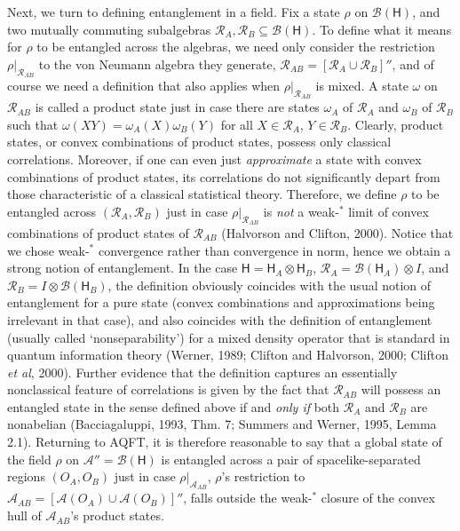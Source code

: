 \documentclass[12pt]{article}
\newcommand{\alg}[1]{\mbox{$\mathcal{#1}$}}
\newcommand{\hil}[1]{\mbox{$\mathsf{#1}$}}
\begin{document}
Next, we turn to defining entanglement in a field.  Fix a state $\rho$  on 
$\alg{B}(\hil{H})$, and
two mutually commuting subalgebras $\alg{R}_{A},\alg{R}_{B}\subseteq\alg{B}(\hil{H})$.
  To define what it means for $\rho$ to be 
entangled across the algebras, we need only consider the 
restriction $\rho|_{\alg{R}_{AB}}$ to the von Neumann algebra they generate, 
$\alg{R}_{AB}=[\alg{R}_{A}\cup\alg{R}_{B}]''$, and of course we need a 
definition that also applies when 
$\rho|_{\alg{R}_{AB}}$ is mixed.
A state $\omega$ on $\alg{R}_{AB}$ is called a product 
 state just in case there are states $\omega _{A}$ of
$\alg{R}_{A}$ and $\omega _{B}$ of $\alg{R}_{B}$ such that
$\omega (XY)=\omega _{A}(X)\omega _{B}(Y)$ for all 
$X\in\alg{R}_{A}$, $Y\in\alg{R}_{B}$.
Clearly, product states, or convex combinations of product states, 
possess only classical correlations.  Moreover, if one can even just 
\emph{approximate} a state with convex combinations of product 
states, its correlations do not significantly depart from 
those characteristic of a classical statistical theory.  Therefore, we define $\rho$ 
to be entangled across $(\alg{R}_{A},\alg{R}_{B})$ just in case 
$\rho|_{\alg{R}_{AB}}$ 
is \emph{not} a weak-$^{*}$ limit of convex combinations of product states of 
$\alg{R}_{AB}$ (Halvorson and Clifton, 2000).      
Notice that we chose weak-$^{*}$ convergence rather than convergence in 
norm, hence we obtain a strong notion of 
entanglement.  In the case $\hil{H}=\hil{H}_{A}\otimes 
\hil{H}_{B}$, $\alg{R}_{A}=\alg{B}(\hil{H}_{A})\otimes I$, and 
$\alg{R}_{B}=I\otimes\alg{B}(\hil{H}_{B})$, the definition obviously 
coincides with the usual notion of entanglement for a pure state 
(convex combinations and approximations being irrelevant in 
that case), and also coincides with
the definition of entanglement (usually called `nonseparability') for a mixed density operator  
that is standard in quantum information theory 
 (Werner, 
1989; Clifton 
and Halvorson, 2000; Clifton \emph{et al}, 2000).  Further evidence 
that the definition captures 
an essentially nonclassical feature of correlations is given by the fact  that  
$\alg{R}_{AB}$ will possess an entangled state in the sense defined 
above
 if and \emph{only if} both $\alg{R}_{A}$ and $\alg{R}_{B}$ are nonabelian 
 (Bacciagaluppi, 1993, Thm. 7; Summers 
 and Werner, 1995, Lemma 2.1). 
Returning to AQFT, it is therefore reasonable to say that
 a global state of the field $\rho$ on $\alg{A}''=\alg{B}(\hil{H})$ is entangled across 
a pair of spacelike-separated regions $(O_{A},O_{B})$ just in case 
$\rho|_{\alg{A}_{AB}}$, $\rho$'s restriction to 
$\alg{A}_{AB}=[\alg{A}(O_{A})\cup\alg{A}(O_{B})]''$, falls outside 
the weak-$^{*}$ closure of the convex hull of $\alg{A}_{AB}$'s product states.
\end{document}
